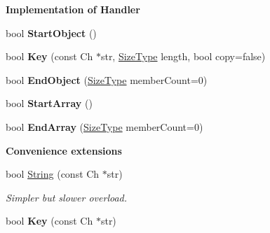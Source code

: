 \begin{Indent}{\bf Implementation of Handler}
\begin{DoxyCompactItemize}
\item 
bool {\bfseries Start\+Object} ()\hypertarget{classPrettyWriter_a27bdda225dc152b8974e44c1df7525b7}{}\label{classPrettyWriter_a27bdda225dc152b8974e44c1df7525b7}

\item 
bool {\bfseries Key} (const Ch $\ast$str, \hyperlink{rapidjson_8h_a5ed6e6e67250fadbd041127e6386dcb5}{Size\+Type} length, bool copy=false)\hypertarget{classPrettyWriter_a20ecbe1d31a871e4da4a3899b40ad3cd}{}\label{classPrettyWriter_a20ecbe1d31a871e4da4a3899b40ad3cd}

\item 
bool {\bfseries End\+Object} (\hyperlink{rapidjson_8h_a5ed6e6e67250fadbd041127e6386dcb5}{Size\+Type} member\+Count=0)\hypertarget{classPrettyWriter_a6bfdfa4193193ef763cce5c592c4d20c}{}\label{classPrettyWriter_a6bfdfa4193193ef763cce5c592c4d20c}

\item 
bool {\bfseries Start\+Array} ()\hypertarget{classPrettyWriter_aec7fdf4798a3af5e31c147633f4798ed}{}\label{classPrettyWriter_aec7fdf4798a3af5e31c147633f4798ed}

\item 
bool {\bfseries End\+Array} (\hyperlink{rapidjson_8h_a5ed6e6e67250fadbd041127e6386dcb5}{Size\+Type} member\+Count=0)\hypertarget{classPrettyWriter_a1e9d97fc950d349f55abd864c787ff37}{}\label{classPrettyWriter_a1e9d97fc950d349f55abd864c787ff37}

\end{DoxyCompactItemize}
\end{Indent}
\begin{Indent}{\bf Convenience extensions}\par
\begin{DoxyCompactItemize}
\item 
bool \hyperlink{classPrettyWriter_a7e85689355a827d273f272c26b447225}{String} (const Ch $\ast$str)\hypertarget{classPrettyWriter_a7e85689355a827d273f272c26b447225}{}\label{classPrettyWriter_a7e85689355a827d273f272c26b447225}

\begin{DoxyCompactList}\small\item\em Simpler but slower overload. \end{DoxyCompactList}\item 
bool {\bfseries Key} (const Ch $\ast$str)\hypertarget{classPrettyWriter_a4b2a2a6eef02c12d7a3fd77966bd4499}{}\label{classPrettyWriter_a4b2a2a6eef02c12d7a3fd77966bd4499}

\end{DoxyCompactItemize}
\end{Indent}
